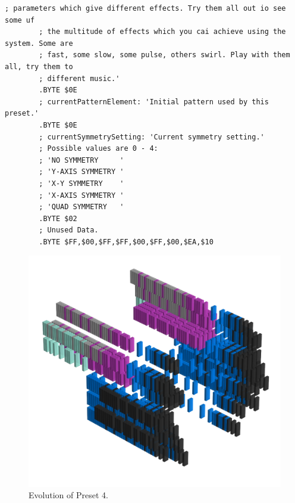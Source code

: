 \begin{lstlisting}[basicstyle=\tiny,caption=Source code for Preset 3.]
        ; parameters which give different effects. Try them all out io see some uf
        ; the multitude of effects which you cai achieve using the system. Some are
        ; fast, some slow, some pulse, others swirl. Play with them all, try them to
        ; different music.'
        .BYTE $0E
        ; currentPatternElement: 'Initial pattern used by this preset.'
        .BYTE $0E
        ; currentSymmetrySetting: 'Current symmetry setting.'
        ; Possible values are 0 - 4:
        ; 'NO SYMMETRY     '
        ; 'Y-AXIS SYMMETRY '
        ; 'X-Y SYMMETRY    '
        ; 'X-AXIS SYMMETRY '
        ; 'QUAD SYMMETRY   '
        .BYTE $02
        ; Unused Data.
        .BYTE $FF,$00,$FF,$FF,$00,$FF,$00,$EA,$10
\end{lstlisting}


\clearpage                                                                 
\begin{figure}[H]                                                          
    \centering                                                             
    \begin{adjustbox}{width=14cm,center}                                   
      \includegraphics[width=14cm]{src/presets/pattern4-45.png}%
    \end{adjustbox}                                                        
\caption{Evolution of Preset 4.}                                           
\end{figure}                                                               
\clearpage                                                                 
                                                                           
